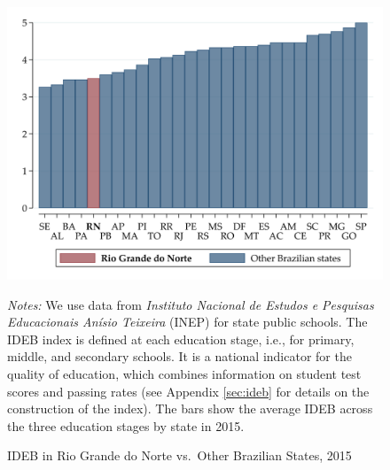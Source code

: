 \documentclass[11pt,a4paper]{article}
\begin{document}
\null
\vfill
\begin{figure}[ht!]
    \caption{IDEB in Rio Grande do Norte vs.\ Other Brazilian States, 2015}
    \label{fig:IDEB_byState}
    \centering
    \includegraphics[width=13cm]{DataWork/Output/Figures/figA1-IDEB_byState.png}
    \begin{minipage}{0.835\textwidth}
        \small{\textit{Notes:} We use data from \textit{Instituto Nacional de Estudos e Pesquisas Educacionais Anísio Teixeira} (INEP) for state public schools. The IDEB index is defined at each education stage, i.e., for primary, middle, and secondary schools. It is a national indicator for the quality of education, which combines information on student test scores and passing rates (see Appendix \ref{sec:ideb} for details on the construction of the index). The bars show the average IDEB across the three education stages by state in 2015.}
    \end{minipage}
\end{figure}
\vfill
\end{document}
